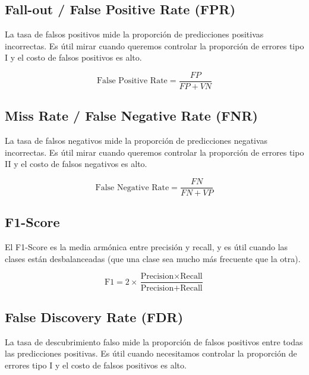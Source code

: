\documentclass[12pt]{article}
\begin{document}
\subsection{Fall-out / False Positive Rate (FPR)}
La tasa de falsos positivos mide la proporción de predicciones positivas incorrectas. Es útil mirar cuando queremos controlar la proporción de errores tipo I y el costo de falsos positivos es alto.

\vspace{0.3em}

\[
\text{False Positive Rate} = \frac{FP}{FP + VN}
\]

\vspace{0.3em}

\subsection{Miss Rate / False Negative Rate (FNR)}
La tasa de falsos negativos mide la proporción de predicciones negativas incorrectas. Es útil mirar cuando queremos controlar la proporción de errores tipo II y el costo de falsos negativos es alto.

\vspace{0.3em}

\[
\text{False Negative Rate} = \frac{FN}{FN + VP}
\]

\vspace{0.3em}


\subsection{F1-Score}
El F1-Score es la media armónica entre precisión y recall, y es útil cuando las clases están desbalanceadas (que una clase sea mucho más frecuente que la otra).

\vspace{0.3em}

\[
\text{F1} = 2 \times \frac{\text{Precision} \times \text{Recall}}{\text{Precision} + \text{Recall}}
\]

\vspace{0.3em}

\subsection{False Discovery Rate (FDR)}
La tasa de descubrimiento falso mide la proporción de falsos positivos entre todas las predicciones positivas. Es útil cuando necesitamos controlar la proporción de errores tipo I y el costo de falsos positivos es alto.
\end{document}
